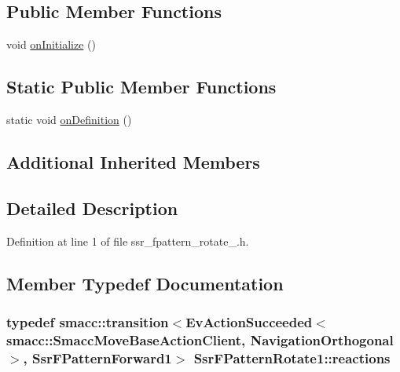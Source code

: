 \subsection*{Public Member Functions}
\begin{DoxyCompactItemize}
\item 
void \hyperlink{structSsrFPatternRotate1_aaf280a67edc0719088176780968dbc01}{on\+Initialize} ()
\end{DoxyCompactItemize}
\subsection*{Static Public Member Functions}
\begin{DoxyCompactItemize}
\item 
static void \hyperlink{structSsrFPatternRotate1_a7c51ce804c50c0a9d87736dd94c1a978}{on\+Definition} ()
\end{DoxyCompactItemize}
\subsection*{Additional Inherited Members}


\subsection{Detailed Description}


Definition at line 1 of file ssr\+\_\+fpattern\+\_\+rotate\+\_.\+h.



\subsection{Member Typedef Documentation}
\subsubsection[{\texorpdfstring{reactions}{reactions}}]{\setlength{\rightskip}{0pt plus 5cm}typedef {\bf smacc\+::transition}$<$Ev\+Action\+Succeeded$<${\bf smacc\+::\+Smacc\+Move\+Base\+Action\+Client}, {\bf Navigation\+Orthogonal}$>$, {\bf Ssr\+F\+Pattern\+Forward1}$>$ {\bf Ssr\+F\+Pattern\+Rotate1\+::reactions}}\hypertarget{structSsrFPatternRotate1_a13565ec233d28127e8e5f3690390e6ec}{}\label{structSsrFPatternRotate1_a13565ec233d28127e8e5f3690390e6ec}


